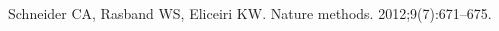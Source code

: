 \documentclass[10pt,letterpaper]{article}
\begin{document}
\nolinenumbers

%
%
% 
\begin{thebibliography}{10}

Schneider CA, Rasband WS, Eliceiri KW.
\newblock Nature methods. 2012;9(7):671--675.


\end{thebibliography}
\end{document}
